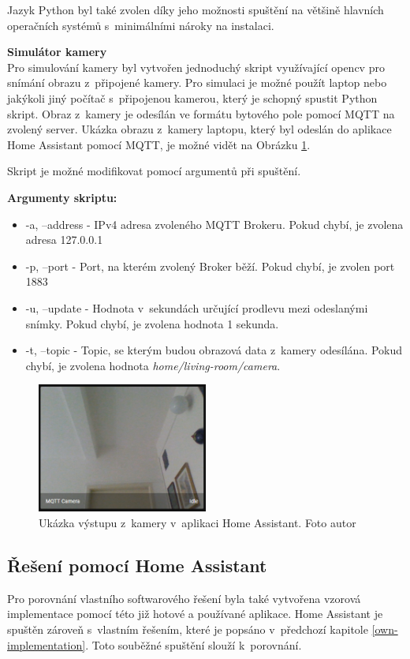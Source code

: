 Jazyk Python byl také zvolen díky jeho možnosti spuštění na většině hlavních operačních systémů s~minimálními nároky na instalaci.

\noindent\textbf{Simulátor kamery}\mbox{} \\ \label{MQTT-camera-simulator}
Pro simulování kamery byl vytvořen jednoduchý skript využívající opencv pro snímání obrazu z~připojené kamery. Pro simulaci je možné použít laptop nebo jakýkoli jiný počítač s~připojenou kamerou, který je schopný spustit Python skript.
Obraz z~kamery je odesílán ve formátu bytového pole pomocí MQTT na zvolený server. Ukázka obrazu z~kamery laptopu, který byl odeslán do aplikace Home Assistant pomocí MQTT, je možné vidět na Obrázku \ref{cameraShowcase}.

Skript je možné modifikovat pomocí argumentů při spuštění.

\noindent\textbf{Argumenty skriptu:}
\begin{itemize}
  \item -a, --address - IPv4 adresa zvoleného MQTT Brokeru. Pokud chybí, je zvolena adresa 127.0.0.1
  \item -p, --port - Port, na kterém zvolený Broker běží. Pokud chybí, je zvolen port 1883
  \item -u, --update - Hodnota v~sekundách určující prodlevu mezi odeslanými snímky. Pokud chybí, je zvolena hodnota 1 sekunda.
  \item -t, --topic - Topic, se kterým budou obrazová data z~kamery odesílána. Pokud chybí, je zvolena hodnota \emph{home/living-room/camera}.
\end{itemize}

\begin{figure}[H]
  \centering
  \includegraphics[width=0.5\textwidth]{obrazky-figures/dashboards/cameraShowcase.PNG}
  \caption{Ukázka výstupu z~kamery v~aplikaci Home Assistant. Foto autor}
  \label{cameraShowcase}
\end{figure}

\subsection*{Řešení pomocí Home Assistant}
Pro porovnání vlastního softwarového řešení byla také vytvořena vzorová implementace pomocí této již hotové a používané aplikace. Home Assistant je spuštěn zároveň s~vlastním řešením, které je popsáno v~předchozí kapitole \ref{own-implementation}. Toto souběžné spuštění slouží k~porovnání.

